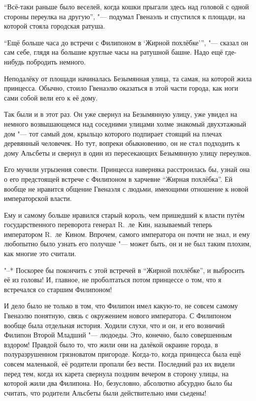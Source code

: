 \enquote{Всё-таки раньше было веселей, когда кошки прыгали здесь над головой с одной
стороны переулка на другую}, "--- подумал Гвенаэль и спустился к площади, на
которой стояла городская ратуша.

\enquote{Ещё больше часа до встречи с Филипоном в \enquote{Жирной похлёбке}},
"--- сказал он сам себе, глядя на большие круглые часы на ратушной башне.
Надо ещё где-нибудь побродить немного.

Неподалёку от площади начиналась Безымянная улица, та самая, на которой жила
принцесса.
Обычно, стоило Гвенаэлю оказаться в этой части города, как ноги сами собой вели
его к её дому.

Так были и в этот раз.
Он уже свернул на Безымянную улицу, уже увидел на немного возвышающемся над
соседними улицами холме знакомый двухэтажный дом "--- тот самый дом, крыльцо
которого подпирает стоящий на плечах деревянный человечек.
Но тут, вопреки обыкновению, он не стал подходить к дому Альсбеты и свернул в
один из пересекающих Безымянную улицу переулков.

Его мучили угрызения совести.
Принцесса наверняка расстроилась бы, узнай она о его предстоящей встрече с
Филипоном в харчевне \enquote{Жирная похлёбка}.
Ей вообще не нравится общение Гвенаэля с людьми, имеющими отношение к новой
императорской власти.

Ему и самому больше нравился старый король, чем пришедший к власти путём
государственного переворота генерал R.~ле~Кин, называемый теперь императором
R.~ле~Кином.
Впрочем, самого императора он почти не знал, и ему любопытно было узнать его
получше "--- может быть, он и не был таким плохим, как многие это считали.

"--* Поскорее бы покончить с этой встречей в \enquote{Жирной похлёбке}, и
выбросить её из головы!
И, главное, не проболтаться потом принцессе о том, что я встречался со старшим
Филипоном!

И дело было не только в том, что Филипон имел какую-то, не совсем самому
Гвенаэлю понятную, связь с окружением нового императора.
С Филипоном вообще была отдельная история.
Ходили слухи, что и он, и его возничий Филипон Второй Младший "--- людоеды.
Это, конечно, было совершенным вздором!
Правдой было то, что жили они на далёкой окраине города, в полуразрушенном
грязноватом пригороде.
Когда-то, когда принцесса была ещё совсем маленькой, её родители пропали без
вести.
Последний раз их видели перед тем, когда их карета свернула поздним вечером в
сторону улицы, на которой жили два Филипона.
Но, безусловно, абсолютно абсурдно было бы считать, что родители Альсбеты были
действительно ими съедены!

